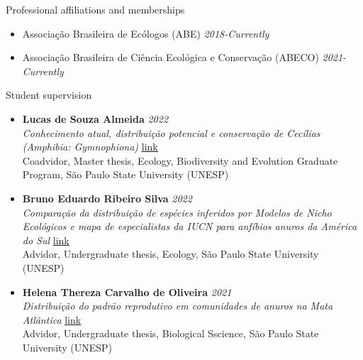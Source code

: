 \documentclass{resume}
\begin{document}

\begin{rSection}{Professional affiliations and memberships}
\begin{itemize}
\item Associação Brasileira de Ecólogos (ABE) \hfill{\em 2018-Currently}
\item Associação Brasileira de Ciência Ecológica e Conservação (ABECO) \hfill{\em 2021-Currently}
\end{itemize}
\end{rSection}


\begin{rSection}{Student supervision}
\begin{itemize}
\item {\bf Lucas de Souza Almeida} \hfill{\em 2022} 
\\ {\it Conhecimento atual, distribuição potencial e conservação de Cecílias (Amphibia: Gymnophiona)} \href{https://repositorio.unesp.br/items/bf694946-b6bf-4816-bacb-71da034d5219}{\underline{link}} 
\\ Coadvidor, Master thesis, Ecology, Biodiversity and Evolution Graduate Program, São Paulo State University (UNESP)

\item {\bf Bruno Eduardo Ribeiro Silva} \hfill{\em 2022} 
\\ {\it Comparação da distribuição de espécies inferidos por Modelos de Nicho Ecológicos e mapa de especialistas da IUCN para anfíbios anuros da América do Sul} \href{https://repositorio.unesp.br/items/190f34f7-f0a7-4458-9dfc-ef8890bf0ca2}{\underline{link}} 
\\ Advidor, Undergraduate thesis, Ecology, São Paulo State University (UNESP)

\item {\bf Helena Thereza Carvalho de Oliveira} \hfill{\em 2021} 
\\ {\it Distribuição do padrão reprodutivo em comunidades de anuros na Mata Atlântica} \href{https://repositorio.unesp.br/items/c8b867f6-4fd0-4e07-853a-abbf74d64c23}{\underline{link}} 
\\ Advidor, Undergraduate thesis, Biological Sscience, São Paulo State University (UNESP)
\end{itemize}
\end{rSection}
\end{document}
